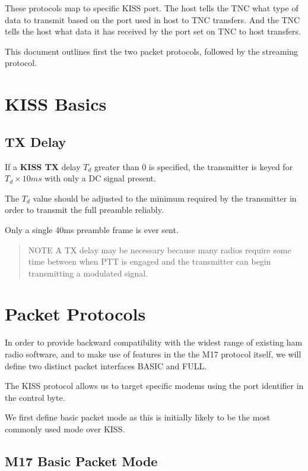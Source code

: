\documentclass[a4paper,11pt,oneside]{book}
\begin{document}
These protocols map to specific KISS port. The host tells the TNC what type of data to transmit based on the port used in host to TNC transfers. And the TNC tells the host what data it has received by the port set on TNC to host transfers.

This document outlines first the two packet protocols, followed by the streaming protocol.

\section{KISS Basics}

\subsection{TX Delay}

If a \textbf{KISS TX} delay $T_d$ greater than 0 is specified, the transmitter is keyed for $T_d \times 10ms$ with only a DC signal present.

The $T_d$ value should be adjusted to the minimum required by the
transmitter in order to transmit the full preamble reliably.

Only a single 40ms preamble frame is ever sent.

\begin{quote}
	NOTE A TX delay may be necessary because many radios require some 	time between when PTT is engaged and the transmitter can begin 	transmitting a modulated signal.
\end{quote}

\section{Packet Protocols}

In order to provide backward compatibility with the widest range of existing ham radio software, and to make use of features in the the M17 protocol itself, we will define two distinct packet interfaces BASIC and FULL.

The KISS protocol allows us to target specific modems using the port identifier in the control byte.

We first define basic packet mode as this is initially likely to be the most commonly used mode over KISS.

\subsection{M17 Basic Packet Mode}
\end{document}
